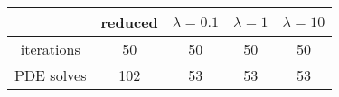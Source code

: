 \begin{tabular}{ccccc}
& reduced & $\lambda = 0.1$ & $\lambda = 1$ & $\lambda = 10$ \\
\hline
iterations & 50 & 50 & 50 & 50 \\
PDE solves & 102 & 53 & 53 & 53 \\
\hline
\end{tabular}
